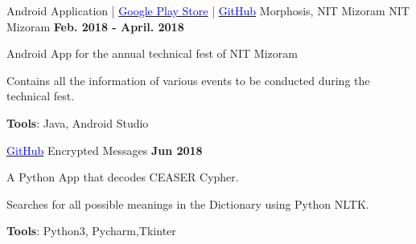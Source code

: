 \begin{cventries}
    \cventry
    {Android Application | \href{https://play.google.com/store/apps/details?id=com.nitmz.morphosis&hl=en}{\textcolor{Blue}{Google Play Store}} | \href{https://github.com/morphosis-nitmz/Morphosis-2k17-Android}{\textcolor{Blue}{GitHub}}}
    {Morphosis, NIT Mizoram}
    {NIT Mizoram}
    {\textbf{Feb. 2018 - April. 2018}}
    {
      \begin{cvitems}
        \item {Android App for the annual technical fest of NIT Mizoram}
        \item{Contains all the information of various events to be conducted during the technical fest.}
        \item{\textbf{Tools}: Java, Android Studio}
      \end{cvitems}
    }
    \cventry
    { \href{https://github.com/yatharth01/encrypted_Messages}{\textcolor{Blue}{GitHub}}}
    {Encrypted Messages}
    {}
    {\textbf{Jun 2018}}
    {
      \begin{cvitems}
        \item {A Python App that decodes CEASER Cypher. }
        \item{Searches for all possible meanings in the Dictionary using Python NLTK.}
      \item{\textbf{Tools}: Python3, Pycharm,Tkinter}
      \end{cvitems}
    }
\end{cventries}  

